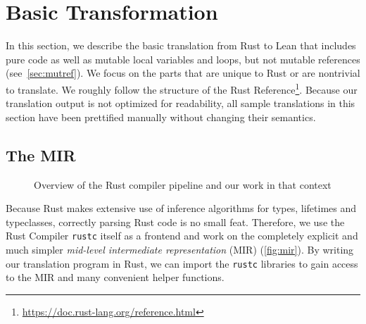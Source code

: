 \section{Basic Transformation}
\label{sec:trans}

In this section, we describe the basic translation from Rust to Lean that
includes pure code as well as mutable local variables and loops, but not mutable
references (see~\autoref{sec:mutref}). We focus on the parts that are unique to
Rust or are nontrivial to translate. We roughly follow the structure of the
Rust Reference\footnote{\url{https://doc.rust-lang.org/reference.html}}. Because
our translation output is not optimized for readability, all sample translations
in this section have been prettified manually without changing their semantics.

\subsection{The MIR}

\begin{figure}[!bp]
  \centering
  \caption{Overview of the Rust compiler pipeline and our work in that context}
  \label{fig:mir}
\end{figure}

Because Rust makes extensive use of inference algorithms for types, lifetimes and typeclasses,
correctly parsing Rust code is no small feat. Therefore, we use the Rust
Compiler \texttt{rustc} itself as a frontend and work on the completely explicit and
much simpler \emph{mid-level intermediate representation} (MIR)
(\autoref{fig:mir}). By writing our translation program in Rust, we can import
the \texttt{rustc} libraries to gain access to the MIR and many convenient
helper functions.


